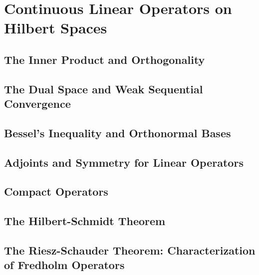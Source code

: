 \chapter{Continuous Linear Operators on Hilbert Spaces}

\section{The Inner Product and Orthogonality}
\section{The Dual Space and Weak Sequential Convergence}
\section{Bessel's Inequality and Orthonormal Bases}
\section{Adjoints and Symmetry for Linear Operators}
\section{Compact Operators}
\section{The Hilbert-Schmidt Theorem}
\section{The Riesz-Schauder Theorem: Characterization of Fredholm Operators}

